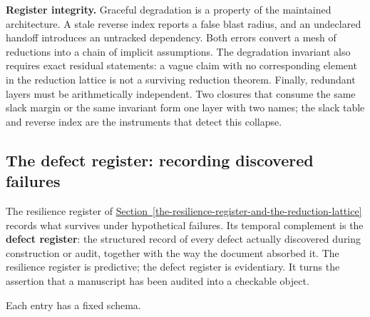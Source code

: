 \documentclass[
  11pt,
]{article}
\theoremstyle{definition}
\newcommand{\secref}[1]{\hyperref[#1]{Section~\ref*{#1}}}
\begin{document}
\textbf{Register integrity.} Graceful degradation is a property of the
maintained architecture. A stale reverse index reports a false blast
radius, and an undeclared handoff introduces an untracked dependency.
Both errors convert a mesh of reductions into a chain of implicit
assumptions. The degradation invariant also requires exact residual
statements: a vague claim with no corresponding element in the reduction
lattice is not a surviving reduction theorem.
Finally, redundant layers must be arithmetically independent. Two
closures that consume the same slack margin or the same invariant form
one layer with two names; the slack table and reverse index are the
instruments that detect this collapse.



\subsection{The defect register: recording discovered
failures}\label{the-defect-register-recording-discovered-failures}

The resilience register of \secref{the-resilience-register-and-the-reduction-lattice} records what survives under
hypothetical failures. Its temporal complement is the \textbf{defect
register}: the structured record of every defect actually discovered
during construction or audit, together with the way the document
absorbed it. The resilience register is predictive; the defect register
is evidentiary. It turns the assertion that a manuscript has been
audited into a checkable object.

Each entry has a fixed schema.
\end{document}
